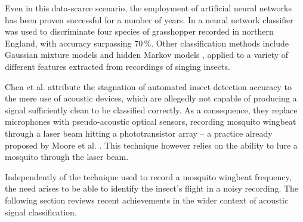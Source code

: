 \documentclass[10pt, twocolumn]{llncs}
\newcommand{\dzn}[1]{\todo[color=yellow!30]{[dz] #1}}
\newcommand{\bpN}[1]{\todo[inline, size=\small, color=purple!30]{[bp] #1}}
\begin{document}
Even in this data-scarce scenario, the employment of artificial neural networks has been proven successful for a number of years. In \cite{chesmore2004automated} a neural network classifier was used to discriminate four species of grasshopper recorded in northern England, with accuracy surpassing 70\,\%. Other classification methods include Gaussian mixture models \cite{Potamitis2007,Pinhas2008} and hidden Markov models \cite{leqing2010insect,zilli2014hidden}, applied to a variety of different features extracted from recordings of singing insects.

Chen et al. \cite{chen2014flying} attribute the stagnation of automated insect detection accuracy to the mere use of acoustic devices, which are allegedly not capable of producing a signal sufficiently clean to be classified correctly. As a consequence, they replace microphones with pseudo-acoustic optical sensors, recording mosquito wingbeat through a laser beam hitting a phototransistor array -- a practice already proposed by Moore et al. \cite{moore1986automated}. This technique however relies on the ability to lure a mosquito through the laser beam. 

Independently of the technique used to record a mosquito wingbeat frequency, the need arises to be able to identify the insect's flight in a noisy recording. The following section reviews recent achievements in the wider context of acoustic signal classification. 




\end{document}
